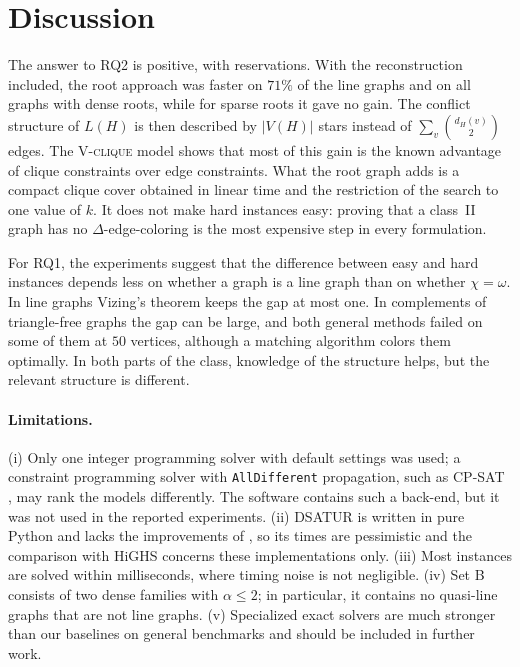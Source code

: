 \documentclass[11pt,a4paper]{article}
\newcommand{\Vclique}{\textsc{V-clique}}
\begin{document}
\begin{table}[!tb]
\centering\small
\caption{Spearman's $\rho$ between structural parameters and measures of
difficulty. $T_V$ on set B is restricted to solved instances; node counts of
runs stopped at the time limit are the counts at interruption. Values marked
with $^{\circ}$ are not significant at the level $0.001$.}
\label{tab:corr}

\end{table}

\section{Discussion}

The answer to RQ2 is positive, with reservations. With the reconstruction
included, the root approach was faster on $71\%$ of the line graphs and on all
graphs with dense roots, while for sparse roots it gave no gain. The conflict
structure of $L(H)$ is then described by $|V(H)|$ stars instead of
$\sum_v\binom{d_H(v)}{2}$ edges. The \Vclique{} model shows that most of this
gain is the known advantage of clique constraints over edge constraints. What
the root graph adds is a compact clique cover obtained in linear time and the
restriction of the search to one value of $k$. It does not make hard instances
easy: proving that a class~II graph has no $\Delta$-edge-coloring is the most
expensive step in every formulation.

For RQ1, the experiments suggest that the difference between easy and hard
instances depends less on whether a graph is a line graph than on whether
$\chi=\omega$. In line graphs Vizing's theorem keeps the gap at most one. In
complements of triangle-free graphs the gap can be large, and both general
methods failed on some of them at $50$ vertices, although a matching algorithm
colors them optimally. In both parts of the class, knowledge of the structure
helps, but the relevant structure is different.

\paragraph{Limitations.}
(i) Only one integer programming solver with default settings was used; a
constraint programming solver with \texttt{AllDifferent} propagation, such as
CP-SAT \cite{perron2023}, may rank the models differently. The software
contains such a back-end, but it was not used in the reported experiments.
(ii) DSATUR is written in pure Python and lacks the improvements of
\cite{sansegundo2012,furini2017}, so its times are pessimistic and the
comparison with HiGHS concerns these implementations only. (iii) Most
instances are solved within milliseconds, where timing noise is not
negligible. (iv) Set B consists of two dense families with $\alpha\le 2$; in
particular, it contains no quasi-line graphs that are not line graphs.
(v) Specialized exact solvers \cite{vanhoeve2022,heule2022,faber2024} are much
stronger than our baselines on general benchmarks and should be included in
further work.
\end{document}
